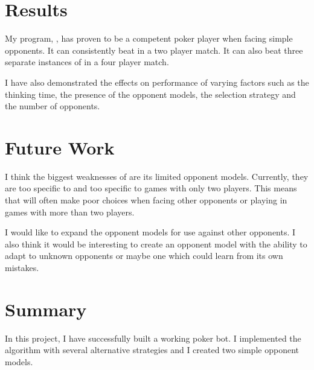 \section{Results}

My program, \mbt, has proven to be a competent poker player when facing simple opponents. It can consistently beat \sbt in a two player match. It can also beat three separate instances of \sbt in a four player match.

I have also demonstrated the effects on performance of varying factors such as the thinking time, the presence of the opponent models, the selection strategy and the number of opponents. 




\section{Future Work}

I think the biggest weaknesses of \mbt are its limited opponent models. Currently, they are too specific to \sbt and too specific to games with only two players. This means that \mbt will often make poor choices when facing other opponents or playing in games with more than two players. 

I would like to expand the opponent models for use against other opponents. I also think it would be interesting to create an opponent model with the ability to adapt to unknown opponents or maybe one which could learn from its own mistakes. 





\section{Summary}


In this project, I have successfully built a working poker bot. I implemented the \mcts algorithm with several alternative strategies and I created two simple opponent models. 


